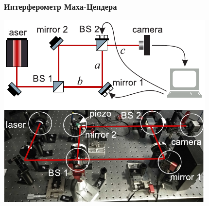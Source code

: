 \begin{frame}
\frametitle{Интерферометр Маха-Цендера}
  \centering
  \includegraphics[width=0.8\linewidth]{Presentation/images/scheme_with_experiment.pdf}
\end{frame}


